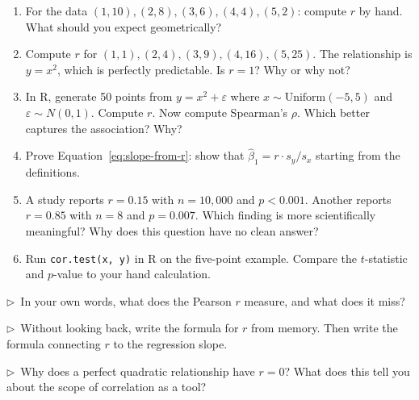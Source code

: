 \begin{enumerate}
  \item For the data $(1, 10), (2, 8), (3, 6), (4, 4), (5, 2)$: compute $r$ by hand. What should you expect geometrically?

  \item Compute $r$ for $(1, 1), (2, 4), (3, 9), (4, 16), (5, 25)$. The relationship is $y = x^2$, which is perfectly predictable. Is $r = 1$? Why or why not?

  \item In R, generate 50 points from $y = x^2 + \varepsilon$ where $x \sim \text{Uniform}(-5, 5)$ and $\varepsilon \sim N(0, 1)$. Compute $r$. Now compute Spearman's $\rho$. Which better captures the association? Why?

  \item Prove Equation~\ref{eq:slope-from-r}: show that $\hat\beta_1 = r \cdot s_y / s_x$ starting from the definitions.

  \item A study reports $r = 0.15$ with $n = 10{,}000$ and $p < 0.001$. Another reports $r = 0.85$ with $n = 8$ and $p = 0.007$. Which finding is more scientifically meaningful? Why does this question have no clean answer?

  \item Run \texttt{cor.test(x, y)} in R on the five-point example. Compare the $t$-statistic and $p$-value to your hand calculation.
\end{enumerate}

\begin{reflect}
$\triangleright$~In your own words, what does the Pearson $r$ measure, and what does it miss?

\smallskip
$\triangleright$~Without looking back, write the formula for $r$ from memory. Then write the formula connecting $r$ to the regression slope.

\smallskip
$\triangleright$~Why does a perfect quadratic relationship have $r = 0$? What does this tell you about the scope of correlation as a tool?
\end{reflect}
